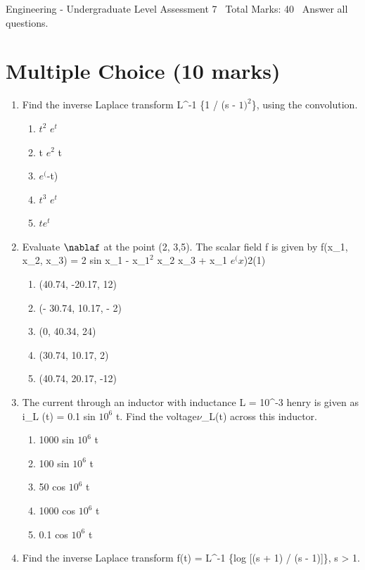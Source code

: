 \documentclass[12pt]{article}
\begin{document}
\begin{center}
Engineering - Undergraduate Level Assessment 7 \
Total Marks: 40 \
Answer all questions.
\end{center}

\section*{Multiple Choice (10 marks)}
\begin{enumerate}[label=\arabic*.]
\item Find the inverse Laplace transform L^-1 \{1 / (s - $1)^2$\}, using the convolution.
\begin{enumerate}[label=(\alph*)]
    \item $t^2$ $e^t$
    \item t $e^2$ t
    \item $e^($-t)
    \item $t^3$ $e^t$
    \item $te^t$
\end{enumerate}
\item Evaluate \ensuremath{\nablaf} at the point (2, 3,5). The scalar field f is given by f(x\_1, x\_2, x\_3) = 2 sin x\_1 - x\_$1^2$ x\_2 x\_3 + x\_1 $e^(x$)2(1)
\begin{enumerate}[label=(\alph*)]
    \item (40.74, -20.17, 12)
    \item (- 30.74, 10.17, - 2)
    \item (0, 40.34, 24)
    \item (30.74, 10.17, 2)
    \item (40.74, 20.17, -12)
\end{enumerate}
\item The current through an inductor with inductance L = 10^-3 henry is given as i\_L (t) = 0.1 sin $10^6$ t. Find the voltage\ensuremath{\nu}\_L(t) across this inductor.
\begin{enumerate}[label=(\alph*)]
    \item 1000 sin $10^6$ t
    \item 100 sin $10^6$ t
    \item 50 cos $10^6$ t
    \item 1000 cos $10^6$ t
    \item 0.1 cos $10^6$ t
\end{enumerate}
\item Find the inverse Laplace transform f(t) = L^-1 \{log [(s + 1) / (s - 1)]\}, s \textgreater{} 1.
\begin{enumerate}[label=(\alph*)]

\end{enumerate}
\end{enumerate}
\end{document}
